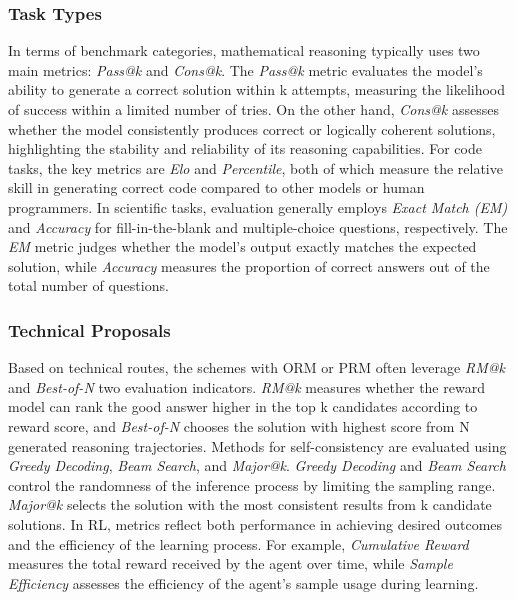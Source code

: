 \subsubsection{Task Types}

In terms of benchmark categories, mathematical reasoning typically uses two main metrics: \textit{Pass@k} and \textit{Cons@k}. The \textit{Pass@k} metric evaluates the model's ability to generate a correct solution within k attempts, measuring the likelihood of success within a limited number of tries. On the other hand, \textit{Cons@k} assesses whether the model consistently produces correct or logically coherent solutions, highlighting the stability and reliability of its reasoning capabilities. For code tasks, the key metrics are \textit{Elo} and \textit{Percentile}, both of which measure the relative skill in generating correct code compared to other models or human programmers. In scientific tasks, evaluation generally employs \textit{Exact Match (EM)} and \textit{Accuracy} for fill-in-the-blank and multiple-choice questions, respectively. 
The \textit{EM} metric judges whether the model's output exactly matches the expected solution, while \textit{Accuracy} measures the proportion of correct answers out of the total number of questions.

\subsubsection{Technical Proposals}

Based on technical routes, the schemes with ORM or PRM often leverage \textit{RM@k} and \textit{Best-of-N} two evaluation indicators. 
\textit{RM@k} measures whether the reward model can rank the good answer higher in the top k candidates according to reward score, and \textit{Best-of-N} chooses the solution with highest score from N generated reasoning trajectories. Methods for self-consistency are evaluated using \textit{Greedy Decoding}, \textit{Beam Search}, and \textit{Major@k}. \textit{Greedy Decoding} and \textit{Beam Search} control the randomness of the inference process by limiting the sampling range. \textit{Major@k} selects the solution with the most consistent results from k candidate solutions. In RL, metrics reflect both performance in achieving desired outcomes and the efficiency of the learning process. For example, \textit{Cumulative Reward} measures the total reward received by the agent over time, while \textit{Sample Efficiency} assesses the efficiency of the agent's sample usage during learning.



